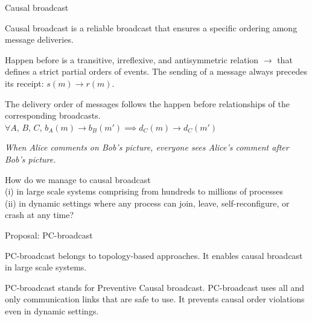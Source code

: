 \documentclass[10pt, xcolor={usenames, dvipsnames}]{beamer}
\begin{document}
\begin{frame}{Causal broadcast}

  Causal broadcast is a reliable broadcast that ensures a specific ordering
  among message deliveries. 
  
  \begin{definition}
    Happen before is a transitive, irreflexive, and antisymmetric relation
    $\rightarrow$ that defines a strict partial orders of events.  The sending
    of a message always precedes its receipt: $s(m) \rightarrow r(m)$.
  \end{definition}

  \vspace{2em}

  \begin{definition}
    The delivery order of messages follows the happen before relationships of the
    corresponding broadcasts. $\forall A,\,B,\,C,\,
    b_A(m) \rightarrow b_B(m') \implies d_C(m) \rightarrow d_C(m')$
  \end{definition}

  \textit{When Alice comments on Bob's picture, everyone sees Alice's comment
    after Bob's picture.}
  
\end{frame}


\begin{frame}[standout]
  How do we manage to causal broadcast\\
  (i) in large scale systems comprising
  from hundreds to millions of processes\\
  (ii) in dynamic settings where any process can join, leave,
  self-reconfigure, or crash at any time?

  \vspace{2em}
  
  

\end{frame}


\begin{frame}{Proposal: PC-broadcast}  

  PC-broadcast belongs to topology-based approaches. It enables causal broadcast
  in large scale systems.

  \vspace{2em}

  PC-broadcast stands for Preventive Causal broadcast. PC-broadcast uses all
  and only communication links that are safe to use. It prevents causal order
  violations even in dynamic settings.

\end{frame}
\end{document}
